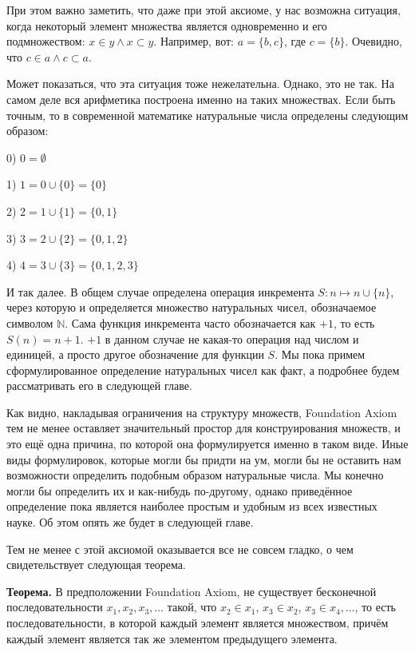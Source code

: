 При этом важно заметить, что даже при этой аксиоме, у нас возможна ситуация, когда некоторый элемент множества является одновременно и его подмножеством: $x\in y \wedge x\subset y$. Например, вот: $a = \{b, c\}$, где $c=\{ b\}$. Очевидно, что $c\in a \wedge c\subset a$.

Может показаться, что эта ситуация тоже нежелательна. Однако, это не так. На самом деле вся арифметика построена именно на таких множествах. Если быть точным, то в современной математике натуральные числа определены следующим образом:

0) $0 = \emptyset$

1) $1 = 0 \cup \{0\} = \{0\}$

2) $2 = 1 \cup \{1\} = \{0, 1\}$

3) $3 = 2\cup \{2\} = \{0, 1, 2\}$

4) $4 = 3 \cup \{3\} = \{0, 1, 2, 3\}$

И так далее. В общем случае определена операция инкремента $S: n\mapsto n\cup \{n\}$, через которую и определяется множество натуральных чисел, обозначаемое символом $\mathbb{N}$. Сама функция инкремента часто обозначается как $+1$, то есть $S(n) = n+1$. $+1$ в данном случае не какая-то операция над числом и единицей, а просто другое обозначение для функции $S$. Мы пока примем сформулированное определение натуральных чисел как факт, а подробнее будем рассматривать его в следующей главе.

Как видно, накладывая ограничения на структуру множеств, Foundation Axiom тем не менее оставляет значительный простор для конструирования множеств, и это ещё одна причина, по которой она формулируется именно в таком виде.  Иные виды формулировок, которые могли бы придти на ум, могли бы не оставить нам возможности определить подобным образом натуральные числа. Мы конечно могли бы определить их и как-нибудь по-другому, однако приведённое определение пока является наиболее простым и удобным из всех известных науке. Об этом опять же будет в следующей главе.

Тем не менее с этой аксиомой оказывается все не совсем гладко, о чем свидетельствует следующая теорема.

{\bfseries Теорема.} В предположении Foundation Axiom, не существует бесконечной последовательности $x_1, x_2, x_3, \ldots$ такой, что $x_2 \in x_1$, $x_3 \in x_2$, $x_3 \in x_4, \ldots$, то есть последовательности, в которой каждый элемент является множеством, причём каждый элемент является так же элементом предыдущего элемента.

